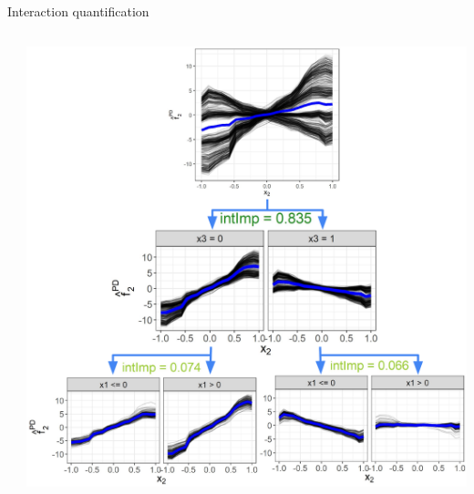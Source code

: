 \begin{frame}{Interaction quantification}
\begin{columns}[T, totalwidth=\textwidth]
\begin{column}{0.46\textwidth}
\begin{center}
{\begin{tikzpicture}[scale=0.7, transform shape]
    \end{tikzpicture}}
        \end{center}
        \end{column}
    \pause
        \begin{column}{0.52\textwidth}
    
    
        \centering
        \includegraphics[width=\textwidth]{figure/sim1}

\end{column}
\end{columns}
\end{frame}
